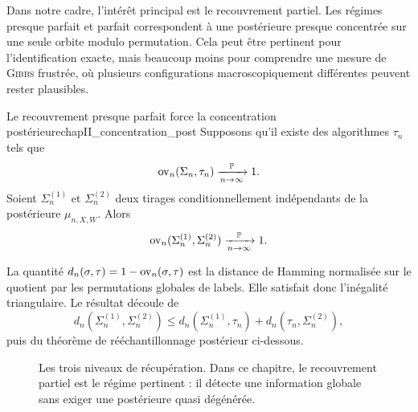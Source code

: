Dans notre cadre, l'intérêt principal est le recouvrement partiel. Les régimes presque parfait et parfait correspondent à une postérieure presque concentrée sur une seule orbite modulo permutation. Cela peut être pertinent pour l'identification exacte, mais beaucoup moins pour comprendre une mesure de \textsc{Gibbs} frustrée, où plusieurs configurations macroscopiquement différentes peuvent rester plausibles.

\begin{Fait}{Le recouvrement presque parfait force la concentration postérieure}{chapII_concentration_post}
Supposons qu'il existe des algorithmes $\tau_n$ tels que
\[
    \operatorname{ov}_n(\Sigma_n,\tau_n)\xrightarrow[n\to\infty]{\mathbb P}1.
\]
Soient $\Sigma_n^{(1)}$ et $\Sigma_n^{(2)}$ deux tirages conditionnellement indépendants de la postérieure $\mu_{n,X,W}$. Alors
\begin{equation}
    \operatorname{ov}_n(\Sigma_n^{(1)},\Sigma_n^{(2)})\xrightarrow[n\to\infty]{\mathbb P}1.
    \label{eq:chapII_posterior_concentration}
\end{equation}
\end{Fait}

\begin{Preuve}
La quantité $d_n(\sigma,\tau)=1-\operatorname{ov}_n(\sigma,\tau)$ est la distance de Hamming normalisée sur le quotient par les permutations globales de labels. Elle satisfait donc l'inégalité triangulaire. Le résultat découle de
\[
    d_n(\Sigma_n^{(1)},\Sigma_n^{(2)})
    \le
    d_n(\Sigma_n^{(1)},\tau_n)+d_n(\tau_n,\Sigma_n^{(2)}),
\]
puis du théorème de rééchantillonnage postérieur ci-dessous.
\end{Preuve}

\begin{figure}[H]
\centering
{}
\caption{Les trois niveaux de récupération. Dans ce chapitre, le recouvrement partiel est le régime pertinent : il détecte une information globale sans exiger une postérieure quasi dégénérée.}
\label{fig:chapII_recovery_regimes}
\end{figure}

